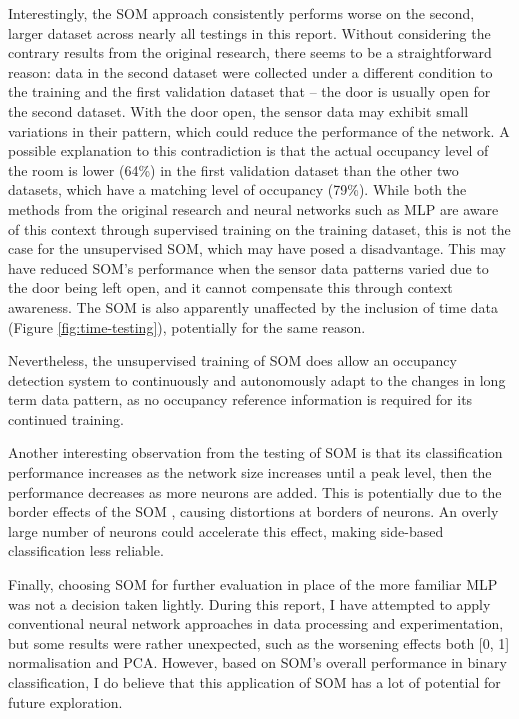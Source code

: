 \documentclass[10pt, oneside]{article}
\begin{document}
Interestingly, the SOM approach consistently performs worse on the second, larger dataset across nearly all testings in this report. Without considering the contrary results from the original research, there seems to be a straightforward reason: data in the second dataset were collected under a different condition to the training and the first validation dataset that -- the door is usually open for the second dataset. With the door open, the sensor data may exhibit small variations in their pattern, which could reduce the performance of the network. A possible explanation to this contradiction is that the actual occupancy level of the room is lower (64\%) in the first validation dataset than the other two datasets, which have a matching level of occupancy (79\%). While both the methods from the original research and neural networks such as MLP are aware of this context through supervised training on the training dataset, this is not the case for the unsupervised SOM, which may have posed a disadvantage. This may have reduced SOM's performance when the sensor data patterns varied due to the door being left open, and it cannot compensate this through context awareness. The SOM is also apparently unaffected by the inclusion of time data (Figure \ref{fig:time-testing}), potentially for the same reason.

Nevertheless, the unsupervised training of SOM does allow an occupancy detection system to continuously and autonomously adapt to the changes in long term data pattern, as no occupancy reference information is required for its continued training. 

Another interesting observation from the testing of SOM is that its classification performance increases as the network size increases until a peak level, then the performance decreases as more neurons are added. This is potentially due to the border effects of the SOM \cite[Sec. 4.5]{kohonen2014matlab}, causing distortions at borders of neurons. An overly large number of neurons could accelerate this effect, making side-based classification less reliable.

Finally, choosing SOM for further evaluation in place of the more familiar MLP was not a decision taken lightly. During this report, I have attempted to apply conventional neural network approaches in data processing and experimentation, but some results were rather unexpected, such as the worsening effects both [0, 1] normalisation and PCA. However, based on SOM's overall performance in binary classification, I do believe that this application of SOM has a lot of potential for future exploration.



\small{}
\end{document}
